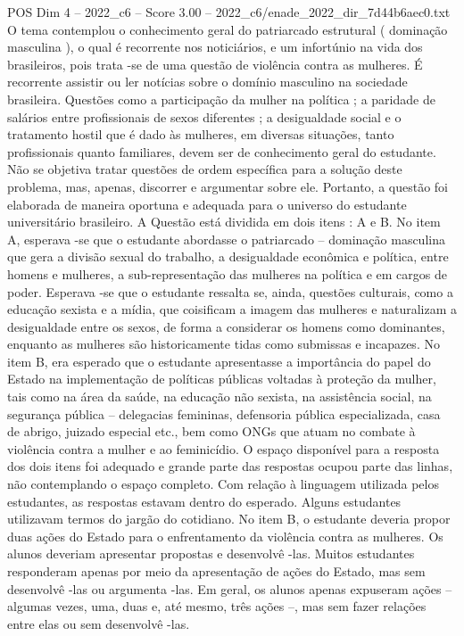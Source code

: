 \begin{textsample}{POS Dim 4 – 2022\_c6 – Score 3.00 – 2022\_c6/enade\_2022\_dir\_7d44b6aec0.txt}
O tema contemplou o conhecimento geral do patriarcado estrutural ( dominação masculina ), o qual é recorrente nos noticiários, e um infortúnio na vida dos brasileiros, pois trata -se de uma questão de violência contra as mulheres.
É recorrente assistir ou ler notícias sobre o domínio masculino na sociedade brasileira.
Questões como a participação da mulher na política ; a paridade de salários entre profissionais de sexos diferentes ; a desigualdade social e o tratamento hostil que é dado às mulheres, em diversas situações, tanto profissionais quanto familiares, devem ser de conhecimento geral do estudante.
Não se objetiva tratar questões de ordem específica para a solução deste problema, mas, apenas, discorrer e argumentar sobre ele.
Portanto, a questão foi elaborada de maneira oportuna e adequada para o universo do estudante universitário brasileiro.
A Questão está dividida em dois itens : A e B.
No item A, esperava -se que o estudante abordasse o patriarcado – dominação masculina que gera a divisão sexual do trabalho, a desigualdade econômica e política, entre homens e mulheres, a sub-representação das mulheres na política e em cargos de poder.
Esperava -se que o estudante ressalta se, ainda, questões culturais, como a educação sexista e a mídia, que coisificam a imagem das mulheres e naturalizam a desigualdade entre os sexos, de forma a considerar os homens como dominantes, enquanto as mulheres são historicamente tidas como submissas e incapazes.
No item B, era esperado que o estudante apresentasse a importância do papel do Estado na implementação de políticas públicas voltadas à proteção da mulher, tais como na área da saúde, na educação não sexista, na assistência social, na segurança pública – delegacias femininas, defensoria pública especializada, casa de abrigo, juizado especial etc., bem como ONGs que atuam no combate à violência contra a mulher e ao feminicídio.
O espaço disponível para a resposta dos dois itens foi adequado e grande parte das respostas ocupou parte das linhas, não contemplando o espaço completo.
Com relação à linguagem utilizada pelos estudantes, as respostas estavam dentro do esperado.
Alguns estudantes utilizavam termos do jargão do cotidiano.
No item B, o estudante deveria propor duas ações do Estado para o enfrentamento da violência contra as mulheres.
Os alunos deveriam apresentar propostas e desenvolvê -las.
Muitos estudantes responderam apenas por meio da apresentação de ações do Estado, mas sem desenvolvê -las ou argumenta -las.
Em geral, os alunos apenas expuseram ações – algumas vezes, uma, duas e, até mesmo, três ações –, mas sem fazer relações entre elas ou sem desenvolvê -las.

\end{textsample}
